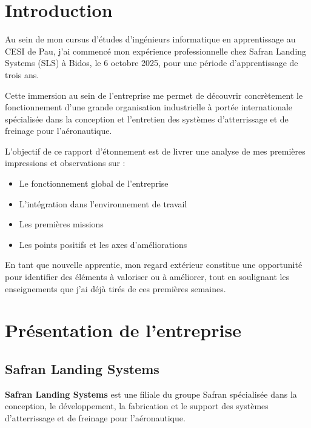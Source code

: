 \section*{Introduction}
Au sein de mon cursus d’études d’ingénieurs informatique en apprentissage au CESI de Pau, j’ai commencé mon expérience professionnelle chez Safran Landing Systems (SLS) à Bidos, le 6 octobre 2025, pour une période d’apprentissage de trois ans.

\noindent Cette immersion au sein de l’entreprise me permet de découvrir concrètement le fonctionnement d’une grande organisation industrielle à portée internationale spécialisée dans la conception et l’entretien des systèmes d’atterrissage et de freinage pour l’aéronautique.

\noindent L’objectif de ce rapport d’étonnement est de livrer une analyse de mes premières impressions et observations sur :
\begin{itemize}
  \item Le fonctionnement global de l’entreprise
  \item	L’intégration dans l’environnement de travail
  \item	Les premières missions
  \item	Les points positifs et les axes d’améliorations
\end{itemize}

\noindent En tant que nouvelle apprentie, mon regard extérieur constitue une opportunité pour identifier des éléments à valoriser ou à améliorer, tout en soulignant les enseignements que j’ai déjà tirés de ces premières semaines.

\newpage

\section*{Présentation de l'entreprise}

\subsection*{Safran Landing Systems}
{}

\textbf{Safran Landing Systems} est une filiale du groupe Safran spécialisée dans la conception, le développement, la fabrication et le support des systèmes d’atterrissage et de freinage pour l’aéronautique.

